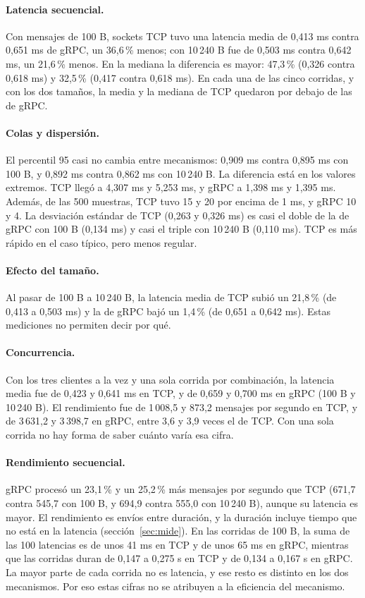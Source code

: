 \documentclass[11pt,a4paper]{article}
\begin{document}
\paragraph{Latencia secuencial.} Con mensajes de 100 B, sockets TCP tuvo una latencia media de
0,413 ms contra 0,651 ms de gRPC, un 36,6\,\% menos; con 10\,240 B fue de 0,503 ms contra
0,642 ms, un 21,6\,\% menos. En la mediana la diferencia es mayor: 47,3\,\% (0,326 contra
0,618 ms) y 32,5\,\% (0,417 contra 0,618 ms). En cada una de las cinco corridas, y con los
dos tamaños, la media y la mediana de TCP quedaron por debajo de las de gRPC.

\paragraph{Colas y dispersión.} El percentil 95 casi no cambia entre mecanismos: 0,909 ms
contra 0,895 ms con 100 B, y 0,892 ms contra 0,862 ms con 10\,240 B. La diferencia está en los
valores extremos. TCP llegó a 4,307 ms y 5,253 ms, y gRPC a 1,398 ms y 1,395 ms. Además, de las
500 muestras, TCP tuvo 15 y 20 por encima de 1 ms, y gRPC 10 y 4. La desviación estándar de TCP
(0,263 y 0,326 ms) es casi el doble de la de gRPC con 100 B (0,134 ms) y casi el triple
con 10\,240 B (0,110 ms). TCP es más rápido en el
caso típico, pero menos regular.

\paragraph{Efecto del tamaño.} Al pasar de 100 B a 10\,240 B, la latencia media de TCP subió
un 21,8\,\% (de 0,413 a 0,503 ms) y la de gRPC bajó un 1,4\,\% (de 0,651 a 0,642 ms). Estas
mediciones no permiten decir por qué.

\paragraph{Concurrencia.} Con los tres clientes a la vez y una sola corrida por combinación, la
latencia media fue de 0,423 y 0,641 ms en TCP, y de 0,659 y 0,700 ms en gRPC (100 B y
10\,240 B). El rendimiento fue de 1\,008,5 y 873,2 mensajes por segundo en TCP, y de 3\,631,2 y
3\,398,7 en gRPC, entre 3,6 y 3,9 veces el de TCP. Con una sola corrida no hay forma de saber
cuánto varía esa cifra.

\paragraph{Rendimiento secuencial.} gRPC procesó un 23,1\,\% y un 25,2\,\% más mensajes por
segundo que TCP (671,7 contra 545,7 con 100 B, y 694,9 contra 555,0 con 10\,240 B), aunque su
latencia es mayor. El rendimiento es envíos entre duración, y la duración incluye tiempo que
no está en la latencia (sección~\ref{sec:mide}). En las corridas de 100 B, la suma de las 100
latencias es de unos 41 ms en TCP y de unos 65 ms en gRPC, mientras que las corridas duran de
0,147 a 0,275 s en TCP y de 0,134 a 0,167 s en gRPC. La mayor parte de cada corrida no es
latencia, y ese resto es distinto en los dos mecanismos. Por eso estas cifras no se atribuyen a
la eficiencia del mecanismo.
\end{document}
